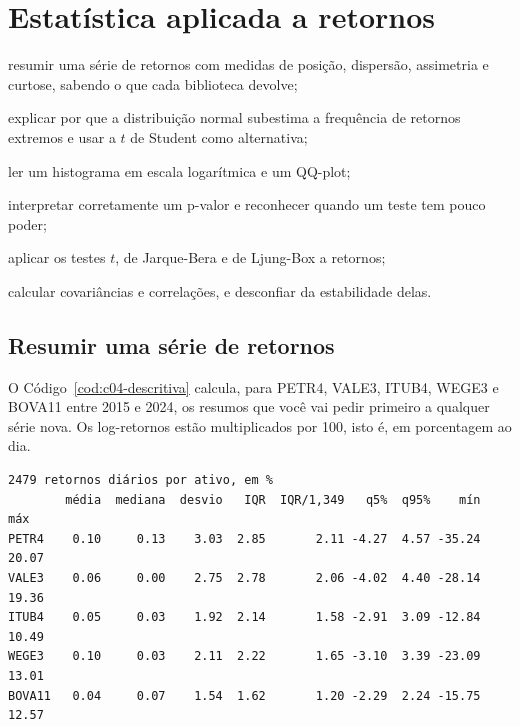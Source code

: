 \chapter{Estatística aplicada a retornos}
\label{cap:estatistica}


\begin{objetivos}
  \item resumir uma série de retornos com medidas de posição, dispersão, assimetria e curtose, sabendo o que cada biblioteca devolve;
  \item explicar por que a distribuição normal subestima a frequência de retornos extremos e usar a $t$ de Student como alternativa;
  \item ler um histograma em escala logarítmica e um QQ-plot;
  \item interpretar corretamente um p-valor e reconhecer quando um teste tem pouco poder;
  \item aplicar os testes $t$, de Jarque-Bera e de Ljung-Box a retornos;
  \item calcular covariâncias e correlações, e desconfiar da estabilidade delas.
\end{objetivos}

\section{Resumir uma série de retornos}
\label{sec:c04-descritiva}

O Código~\ref{cod:c04-descritiva} calcula, para PETR4, VALE3, ITUB4, WEGE3 e BOVA11 entre 2015 e 2024, os resumos que você vai pedir primeiro a qualquer série nova. Os log-retornos estão multiplicados por 100, isto é, em porcentagem ao dia.


\begin{lstlisting}[style=saida]
2479 retornos diários por ativo, em %
        média  mediana  desvio   IQR  IQR/1,349   q5%  q95%    mín    máx
PETR4    0.10     0.13    3.03  2.85       2.11 -4.27  4.57 -35.24  20.07
VALE3    0.06     0.00    2.75  2.78       2.06 -4.02  4.40 -28.14  19.36
ITUB4    0.05     0.03    1.92  2.14       1.58 -2.91  3.09 -12.84  10.49
WEGE3    0.10     0.03    2.11  2.22       1.65 -3.10  3.39 -23.09  13.01
BOVA11   0.04     0.07    1.54  1.62       1.20 -2.29  2.24 -15.75  12.57
\end{lstlisting}

